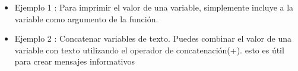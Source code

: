 \begin{itemize}
\begin{itemize}
    \item Ejemplo 1 : Para imprimir el valor de una variable, simplemente incluye a la variable como argumento de la función.
    \begin{figure}[h]
        \centering
      \end{figure}

    \item Ejemplo 2 : Concatenar variables de texto. Puedes combinar el valor de una variable con texto utilizando el operador de concatenación(+). esto es útil para crear mensajes informativos
    \begin{figure}[h]
        \centering
      \end{figure}
\end{itemize}   
\end{itemize}

